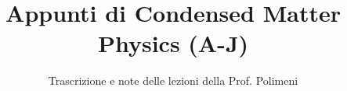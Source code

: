 \documentclass[a4paper,12pt]{article}
\title{Appunti di Condensed Matter Physics (A-J)}
\author{Trascrizione e note delle lezioni della Prof. Polimeni}
\date{}
\begin{document}
\maketitle
\projectintro
\tableofcontents
\newpage

\end{document}
